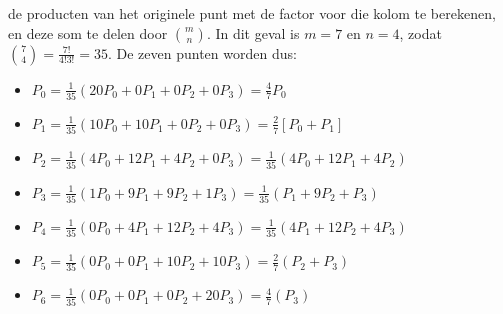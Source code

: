\documentclass{report}
\begin{document}
\begin{itemize}
{\begin{itemize}
			de producten van het originele punt met de factor voor die kolom te berekenen, en deze som te delen door $\binom{m}{n}$. In dit geval is $m = 7$ en $n = 4$, zodat $\binom{7}{4} = \frac{7!}{4! 3!} = 35$. De zeven punten worden dus:
			\begin{itemize}
				\item $P_0 = \frac{1}{35} (20P_0 + 0P_1  + 0P_2  + 0P_3) = \frac{4}{7}P_0$ 
				\item $P_1 = \frac{1}{35}(10P_0 + 10P_1 + 0P_2  + 0P_3) = \frac{2}{7}[P_0 + P_1]$ 
				\item $P_2 = \frac{1}{35}(4P_0  + 12P_1 + 4P_2  + 0P_3) = \frac{1}{35}(4P_0  + 12P_1 + 4P_2)$
				\item $P_3 = \frac{1}{35}(1P_0  + 9P_1 + 9P_2  + 1P_3) = \frac{1}{35}(P_1  + 9P_2 + P_3)$
				\item $P_4 = \frac{1}{35}(0P_0  + 4P_1 + 12P_2  + 4P_3) = \frac{1}{35}(4P_1  + 12P_2 + 4P_3)$
				\item $P_5 = \frac{1}{35}(0P_0  + 0P_1 + 10P_2  + 10P_3) = \frac{2}{7}(P_2 + P_3)$
				\item $P_6 = \frac{1}{35}(0P_0  + 0P_1 + 0P_2  + 20P_3) = \frac{4}{7}(P_3)$
			\end{itemize}
			
			
		\end{itemize}}
\end{itemize}
\end{document}
